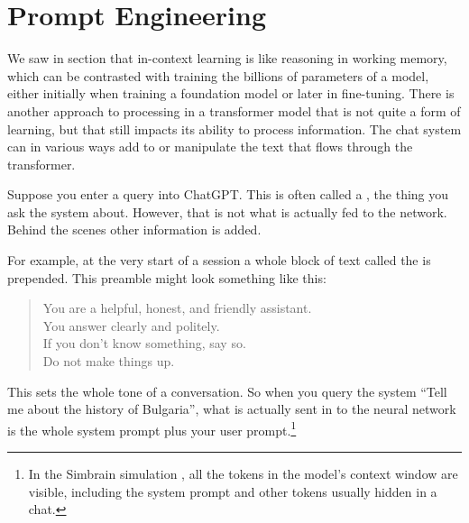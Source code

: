 \section{Prompt Engineering}\label{promptEngineering}

We saw in section  that in-context learning is like reasoning in working memory,
which can be contrasted with training the billions of parameters of a model,
either initially when training a foundation model or later in fine-tuning.
There is another approach to processing in a transformer model that is not
quite a form of learning, but that still impacts its ability to process
information.  The chat system can in various ways add to or manipulate the text that flows through the
transformer. 

Suppose you enter a query into ChatGPT. This is often called a , the thing you ask the
system about. However, that is not what is actually fed to the network. Behind
the scenes other information is added.  

For example, at the very start of a session a whole
block of text called the  is prepended. This preamble might look
something like this:

\begin{quote}
You are a helpful, honest, and friendly assistant.\\
You answer clearly and politely.\\
If you don't know something, say so.\\
Do not make things up.
\end{quote}

This sets the whole tone of a conversation.  So when you query the system ``Tell me about the history of Bulgaria'', what is
actually sent in to the neural network is the whole system prompt plus your
user prompt.\footnote{In the Simbrain simulation , all the tokens in the model's context window are visible, including the system prompt and other tokens usually hidden in a chat.}

